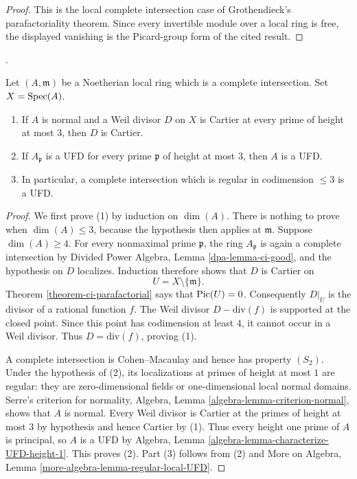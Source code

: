 \begin{proof}
This is the local complete intersection case of Grothendieck's
parafactoriality theorem. Since every invertible module over a local ring is
free, the displayed vanishing is the Picard-group form of the cited result.
\end{proof}

\begin{theorem}
\label{theorem-ci-Cartier-codimension-three}
\begin{reference}
\cite[Expos\'e XI, Corollaire 3.14]{SGA2}.
\end{reference}
Let $(A, \mathfrak m)$ be a Noetherian local ring which is a complete
intersection. Set $X=\mathop{\mathrm{Spec}}(A)$.
\begin{enumerate}
\item If $A$ is normal and a Weil divisor $D$ on $X$ is Cartier at every
prime of height at most $3$, then $D$ is Cartier.
\item If $A_\mathfrak p$ is a UFD for every prime $\mathfrak p$ of height at
most $3$, then $A$ is a UFD.
\item In particular, a complete intersection which is regular in codimension
$\leq 3$ is a UFD.
\end{enumerate}
\end{theorem}

\begin{proof}
We first prove (1) by induction on $\dim(A)$. There is nothing to prove when
$\dim(A)\leq 3$, because the hypothesis then applies at $\mathfrak m$.
Suppose $\dim(A)\geq 4$. For every nonmaximal prime $\mathfrak p$, the ring
$A_\mathfrak p$ is again a complete intersection by Divided Power Algebra,
Lemma \ref{dpa-lemma-ci-good}, and the hypothesis on $D$ localizes. Induction
therefore shows that $D$ is Cartier on
$$
U=X\setminus\{\mathfrak m\}.
$$
Theorem \ref{theorem-ci-parafactorial} says that $\mathop{\mathrm{Pic}}\nolimits(U)=0$. Consequently
$D|_U$ is the divisor of a rational function $f$. The Weil divisor
$D-\text{div}(f)$ is supported at the closed point. Since this point has
codimension at least $4$, it cannot occur in a Weil divisor. Thus
$D=\text{div}(f)$, proving (1).

A complete intersection is Cohen--Macaulay and hence has property $(S_2)$.
Under the hypothesis of (2), its localizations at primes of height at most
$1$ are regular: they are zero-dimensional fields or one-dimensional local
normal domains. Serre's criterion for normality, Algebra, Lemma
\ref{algebra-lemma-criterion-normal}, shows that $A$ is normal. Every Weil
divisor is Cartier at the primes of height at most $3$ by hypothesis and
hence Cartier by (1). Thus every height one prime of $A$ is principal, so
$A$ is a UFD by Algebra, Lemma
\ref{algebra-lemma-characterize-UFD-height-1}. This proves (2). Part (3)
follows from (2) and More on Algebra, Lemma
\ref{more-algebra-lemma-regular-local-UFD}.
\end{proof}






